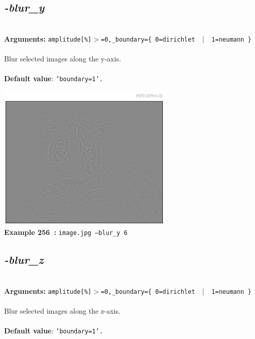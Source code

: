 \documentclass[a4paper,11pt,twoside]{book}
\begin{document}
\subsection{\emph{-blur\_y} }\vspace*{-0.5em}
~\\\textbf{Arguments: } 
{\small \texttt{amplitude[\%]$>$=0,\_boundary=\{ 0=dirichlet ~$|$~ 1=neumann \}}}\\~\\
Blur selected images along the y-axis.
~\\~\\\textbf{Default value}: {\small \texttt{'boundary=1'.}}
\begin{center}\includegraphics[keepaspectratio=true,height=7cm,width=\textwidth]{img/gmic_def256.jpg}\\
{\footnotesize \textbf{Example 256~:} \texttt{image.jpg --blur\_y 6}}
\end{center}

\subsection{\emph{-blur\_z} }\vspace*{-0.5em}
~\\\textbf{Arguments: } 
{\small \texttt{amplitude[\%]$>$=0,\_boundary=\{ 0=dirichlet ~$|$~ 1=neumann \}}}\\~\\
Blur selected images along the z-axis.
~\\~\\\textbf{Default value}: {\small \texttt{'boundary=1'.}}
\end{document}
